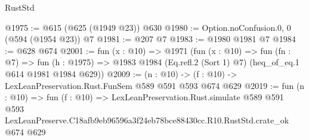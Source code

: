 \begin{lexlean}{RustStd}
\begin{coremodule}
@1975 := @615 (@625 (@1949 @23)) @630
@1980 := Option.noConfusion.{0, 0} (@594 (@1954 @23)) @7
@1981 := @207 @7
@1983 := @1980 @1981 @7
@1984 := @628 @674
@2001 := fun (x : @10) =>
  @1971
    (fun (x : @10) =>
    fun (fn : @7) =>
    fun (h : @1975) => @1983 @1984 (Eq.refl.{2} (Sort 1) @7) (heq_of_eq.{1} @614 @1981 @1984 @629))
@2009 := (n : @10) -> (f : @10) -> LexLeanPreservation.Rust.FunSem @589 @591 @593 @674 @629
@2019 := fun (n : @10) =>
  fun (f : @10) =>
  LexLeanPreservation.Rust.simulate
    @589
    @591
    @593
    LexLeanPreserve.C18afb9eb96596a3f24eb78bce88430cc.R10.RustStd.crate_ok
    @674
    @629
\end{coremodule}
\end{lexlean}
